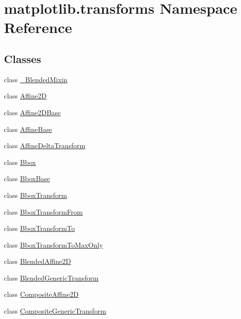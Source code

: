 \hypertarget{namespacematplotlib_1_1transforms}{}\section{matplotlib.\+transforms Namespace Reference}
\label{namespacematplotlib_1_1transforms}
\subsection*{Classes}
\begin{DoxyCompactItemize}
\item 
class \hyperlink{classmatplotlib_1_1transforms_1_1__BlendedMixin}{\+\_\+\+Blended\+Mixin}
\item 
class \hyperlink{classmatplotlib_1_1transforms_1_1Affine2D}{Affine2D}
\item 
class \hyperlink{classmatplotlib_1_1transforms_1_1Affine2DBase}{Affine2\+D\+Base}
\item 
class \hyperlink{classmatplotlib_1_1transforms_1_1AffineBase}{Affine\+Base}
\item 
class \hyperlink{classmatplotlib_1_1transforms_1_1AffineDeltaTransform}{Affine\+Delta\+Transform}
\item 
class \hyperlink{classmatplotlib_1_1transforms_1_1Bbox}{Bbox}
\item 
class \hyperlink{classmatplotlib_1_1transforms_1_1BboxBase}{Bbox\+Base}
\item 
class \hyperlink{classmatplotlib_1_1transforms_1_1BboxTransform}{Bbox\+Transform}
\item 
class \hyperlink{classmatplotlib_1_1transforms_1_1BboxTransformFrom}{Bbox\+Transform\+From}
\item 
class \hyperlink{classmatplotlib_1_1transforms_1_1BboxTransformTo}{Bbox\+Transform\+To}
\item 
class \hyperlink{classmatplotlib_1_1transforms_1_1BboxTransformToMaxOnly}{Bbox\+Transform\+To\+Max\+Only}
\item 
class \hyperlink{classmatplotlib_1_1transforms_1_1BlendedAffine2D}{Blended\+Affine2D}
\item 
class \hyperlink{classmatplotlib_1_1transforms_1_1BlendedGenericTransform}{Blended\+Generic\+Transform}
\item 
class \hyperlink{classmatplotlib_1_1transforms_1_1CompositeAffine2D}{Composite\+Affine2D}
\item 
class \hyperlink{classmatplotlib_1_1transforms_1_1CompositeGenericTransform}{Composite\+Generic\+Transform}

\end{DoxyCompactItemize}
